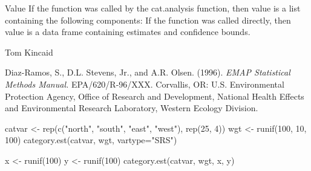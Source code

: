 \begin{Section}{Value}
If the function was called by the cat.analysis function, then value is a list
containing the following components:
If the function was called directly, then value is a data frame containing
estimates and confidence bounds.
\end{Section}
\begin{Author}\relax
Tom Kincaid 
\end{Author}
\begin{References}\relax
Diaz-Ramos, S., D.L. Stevens, Jr., and A.R. Olsen. (1996).  \emph{EMAP
Statistical Methods Manual.} EPA/620/R-96/XXX.  Corvallis, OR: U.S.
Environmental Protection Agency, Office of Research and Development, National
Health Effects and Environmental Research Laboratory, Western Ecology
Division.
\end{References}
\begin{Examples}
\begin{ExampleCode}
catvar <- rep(c("north", "south", "east", "west"), rep(25, 4))
wgt <- runif(100, 10, 100)
category.est(catvar, wgt, vartype="SRS")

x <- runif(100)
y <- runif(100)
category.est(catvar, wgt, x, y)
\end{ExampleCode}
\end{Examples}

